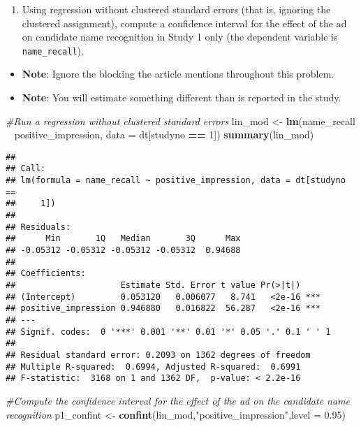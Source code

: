 \documentclass[
]{article}
\newenvironment{Shaded}{\begin{snugshade}}{\end{snugshade}}
\newcommand{\CommentTok}[1]{\textcolor[rgb]{0.56,0.35,0.01}{\textit{#1}}}
\newcommand{\DataTypeTok}[1]{\textcolor[rgb]{0.13,0.29,0.53}{#1}}
\newcommand{\DecValTok}[1]{\textcolor[rgb]{0.00,0.00,0.81}{#1}}
\newcommand{\FloatTok}[1]{\textcolor[rgb]{0.00,0.00,0.81}{#1}}
\newcommand{\KeywordTok}[1]{\textcolor[rgb]{0.13,0.29,0.53}{\textbf{#1}}}
\newcommand{\NormalTok}[1]{#1}
\newcommand{\OperatorTok}[1]{\textcolor[rgb]{0.81,0.36,0.00}{\textbf{#1}}}
\newcommand{\StringTok}[1]{\textcolor[rgb]{0.31,0.60,0.02}{#1}}
\providecommand{\tightlist}{%
  \setlength{\itemsep}{0pt}\setlength{\parskip}{0pt}}
\begin{document}
\begin{enumerate}
\def\labelenumi{\arabic{enumi}.}
\tightlist
\item
  Using regression without clustered standard errors (that is, ignoring
  the clustered assignment), compute a confidence interval for the
  effect of the ad on candidate name recognition in Study 1 only (the
  dependent variable is \texttt{name\_recall}).
\end{enumerate}

\begin{itemize}
\tightlist
\item
  \textbf{Note}: Ignore the blocking the article mentions throughout
  this problem.
\item
  \textbf{Note}: You will estimate something different than is reported
  in the study.
\end{itemize}

\begin{Shaded}
\begin{Highlighting}[]
\CommentTok{#Run a regression without clustered standard errors}
\NormalTok{lin_mod <-}\StringTok{ }\KeywordTok{lm}\NormalTok{(name_recall }\OperatorTok{~}\StringTok{ }\NormalTok{positive_impression, }\DataTypeTok{data =}\NormalTok{ dt[studyno }\OperatorTok{==}\StringTok{ }\DecValTok{1}\NormalTok{])}
\KeywordTok{summary}\NormalTok{(lin_mod)}
\end{Highlighting}
\end{Shaded}

\begin{verbatim}
## 
## Call:
## lm(formula = name_recall ~ positive_impression, data = dt[studyno == 
##     1])
## 
## Residuals:
##      Min       1Q   Median       3Q      Max 
## -0.05312 -0.05312 -0.05312 -0.05312  0.94688 
## 
## Coefficients:
##                     Estimate Std. Error t value Pr(>|t|)    
## (Intercept)         0.053120   0.006077   8.741   <2e-16 ***
## positive_impression 0.946880   0.016822  56.287   <2e-16 ***
## ---
## Signif. codes:  0 '***' 0.001 '**' 0.01 '*' 0.05 '.' 0.1 ' ' 1
## 
## Residual standard error: 0.2093 on 1362 degrees of freedom
## Multiple R-squared:  0.6994, Adjusted R-squared:  0.6991 
## F-statistic:  3168 on 1 and 1362 DF,  p-value: < 2.2e-16
\end{verbatim}

\begin{Shaded}
\begin{Highlighting}[]
\CommentTok{#Compute the confidence interval for the effect of the ad on the candidate name recognition}
\NormalTok{p1_confint <-}\StringTok{ }\KeywordTok{confint}\NormalTok{(lin_mod,}\StringTok{"positive_impression"}\NormalTok{,}\DataTypeTok{level =} \FloatTok{0.95}\NormalTok{)}
\end{Highlighting}
\end{Shaded}
\end{document}

